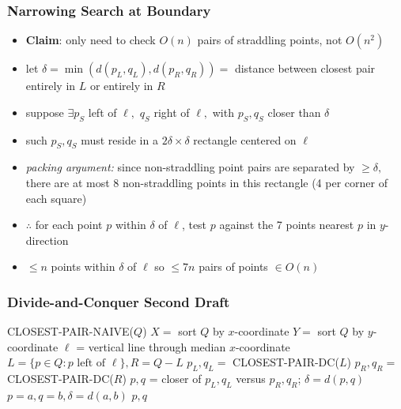 \documentclass{beamer}
\begin{document}
\begin{frame} \frametitle{Narrowing Search at Boundary}
\begin{itemize}
  \item \textbf{Claim}: only need to check $O(n)$ pairs of straddling points, not $O(n^2)$
  \item let $\delta = \min(d(p_L, q_L), d(p_R, q_R)) = $ distance between closest
    pair entirely in $L$ or entirely in $R$
  \item suppose $\exists p_S$ left of $\ell,$ $q_S$ right of $\ell,$ with $p_S, q_S$ closer than $\delta$
  \item such $p_S, q_S$ must reside in a $2\delta \times \delta$ rectangle centered on $\ell$
  \item \emph{packing argument:} since non-straddling point pairs are separated by $\geq \delta,$
    there are at most 8 non-straddling points in this rectangle (4 per corner of each square)
  \item $\therefore$ for each point $p$ within $\delta$ of $\ell$, test $p$ against
    the 7 points nearest $p$ in $y$-direction
  \item $\leq n$ points within $\delta$ of $\ell$ so $\leq 7n$ pairs of points $\in O(n)$
\end{itemize}
\end{frame}

\begin{frame} \frametitle{Divide-and-Conquer Second Draft}
  {\footnotesize
\begin{algorithmic}[1]
      \State \Return CLOSEST-PAIR-NAIVE($Q$)
    \Else
      \State $X = $ sort $Q$ by $x$-coordinate
      \State $Y = $ sort $Q$ by $y$-coordinate
      \State $\ell$ = vertical line through median $x$-coordinate
      \State $L = \{p \in Q : p \text{ left of } \ell\}, R = Q-L$
      \State $p_L, q_L = $ CLOSEST-PAIR-DC($L$)
      \State $p_R, q_R = $ CLOSEST-PAIR-DC($R$)
      \State $p, q$ = closer of $p_L, q_L$ versus $p_R, q_R$; $\delta=d(p,q)$
            \State $p=a, q=b, \delta=d(a,b)$
          \EndIf
        \EndFor
      \EndFor
      \State \Return $p, q$
    \EndIf
  \EndFunction
\end{algorithmic}
}
\end{frame}
\end{document}
